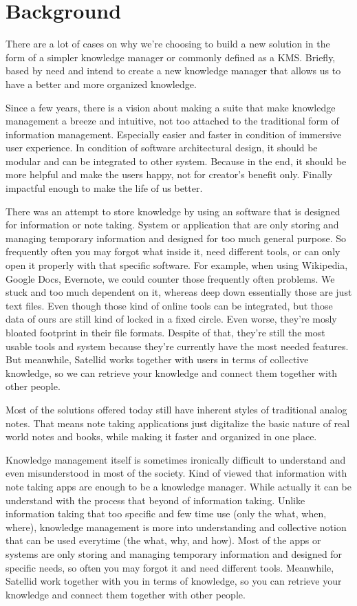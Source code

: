 \section{Background}
\label{sec:background}

There are a lot of cases on why we're choosing to build a new solution in the form of a simpler knowledge manager or commonly defined as a \ac{KMS}.
Briefly, based by need and intend to create a new knowledge manager that allows us to have a better and more organized knowledge.

Since a few years, there is a vision about making a suite that make knowledge management a breeze and intuitive, not too attached to the traditional form of information management.
Especially easier and faster in condition of immersive user experience.
In condition of software architectural design, it should be modular and can be integrated to other system.
Because in the end, it should be more helpful and make the users happy, not for creator's benefit only.
Finally impactful enough to make the life of us better.

There was an attempt to store knowledge by using an software that is designed for information or note taking. System or application that are only storing and managing temporary information and designed for too much general purpose.
So frequently often you may forgot what inside it, need different tools, or can only open it properly with that specific software.
For example, when using Wikipedia, Google Docs, Evernote, we could counter those frequently often problems.
We stuck and too much dependent on it, whereas deep down essentially those are just text files.
Even though those kind of online tools can be integrated, but those data of ours are still kind of locked in a fixed circle.
Even worse, they're mosly bloated footprint in their file formats.
Despite of that, they're still the most usable tools and system because they're currently have the most needed features.
But meanwhile, Satellid works together with users in terms of collective knowledge, so we can retrieve your knowledge and connect them together with other people.

Most of the solutions offered today still have inherent styles of traditional analog notes.
That means note taking applications just digitalize the basic nature of real world notes and books, while making it faster and organized in one place.

Knowledge management itself is sometimes ironically difficult to understand and even misunderstood in most of the society.
Kind of viewed that information with note taking apps are enough to be a knowledge manager.
While actually it can be understand with the process that beyond of information taking.
Unlike information taking that too specific and few time use (only the what, when, where), knowledge management is more into understanding and collective notion that can be used everytime (the what, why, and how).
Most of the apps or systems are only storing and managing temporary information and designed for specific needs, so often you may forgot it and need different tools.
Meanwhile, Satellid work together with you in terms of knowledge, so you can retrieve your knowledge and connect them together with other people.

